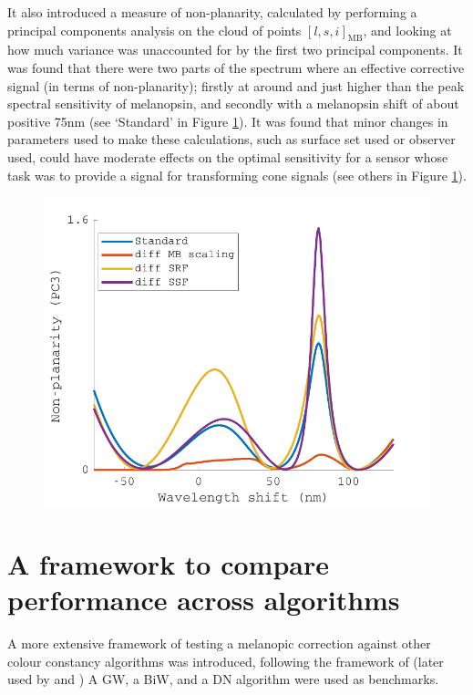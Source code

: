It also introduced a measure of non-planarity, calculated by performing a principal components analysis on the cloud of points $[l,s,i]_{\text{MB}}$, and looking at how much variance was unaccounted for by the first two principal components. It was found that there were two parts of the spectrum where an effective corrective signal (in terms of non-planarity); firstly at around and just higher than the peak spectral sensitivity of melanopsin, and secondly with a melanopsin shift of about positive 75nm (see `Standard' in Figure \ref{fig:PC3}). It was found that minor changes in parameters used to make these calculations, such as surface set used or observer used, could have moderate effects on the optimal sensitivity for a sensor whose task was to provide a signal for transforming cone signals (see others in Figure \ref{fig:PC3}).

\begin{figure}[htbp]
    \includegraphics[max width=\textwidth]{figs/comp/melcomp_6/PC3.pdf}
    \caption{}
    \label{fig:PC3}
\end{figure} 


\section{A framework to compare performance across algorithms}

A more extensive framework of testing a melanopic correction against other colour constancy algorithms was introduced, following the framework of \citet{barnard_comparison_2002} (later used by \citet{hordley_reevaluation_2006} and \citet{gijsenij_computational_2011}) A \gls{GW}, a \gls{BiW}, and a \gls{DN} algorithm were used as benchmarks.

